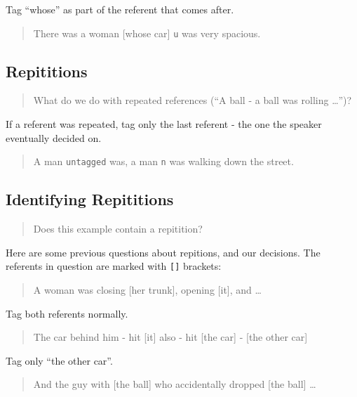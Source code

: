 \documentclass[
]{book}
\begin{document}
Tag ``whose'' as part of the referent that comes after.

\begin{quote}
There was a woman {[}whose car{]} \texttt{u} was very spacious.
\end{quote}

\hypertarget{repititions}{%
\subsection{Repititions}\label{repititions}}

\begin{quote}
What do we do with repeated references (``A ball - a ball was rolling \ldots{}'')?
\end{quote}

If a referent was repeated, tag only the last referent - the one the speaker eventually decided on.

\begin{quote}
A man \texttt{untagged} was, a man \texttt{n} was walking down the street.
\end{quote}

\hypertarget{identifying-repititions}{%
\subsection{Identifying Repititions}\label{identifying-repititions}}

\begin{quote}
Does this example contain a repitition?
\end{quote}

Here are some previous questions about repitions, and our decisions.
The referents in question are marked with \texttt{{[}{]}} brackets:

\begin{quote}
A woman was closing {[}her trunk{]}, opening {[}it{]}, and \ldots{}
\end{quote}

Tag both referents normally.

\begin{quote}
The car behind him - hit {[}it{]} also - hit {[}the car{]} - {[}the other car{]}
\end{quote}

Tag only ``the other car''.

\begin{quote}
And the guy with {[}the ball{]} who accidentally dropped {[}the ball{]} \ldots{}
\end{quote}
\end{document}
